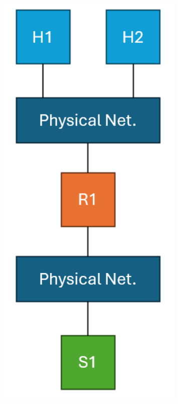\documentclass[compress]{beamer}
\begin{document}
\begin{frame}
\begin{columns}
            \begin{column}{0.3\textwidth}
                \begin{figure}
                    \centering
                    \includegraphics[width=0.8\textwidth]{img/example-net}
                \end{figure}
            \end{column}
        \end{columns}
    \end{frame}
\end{document}

